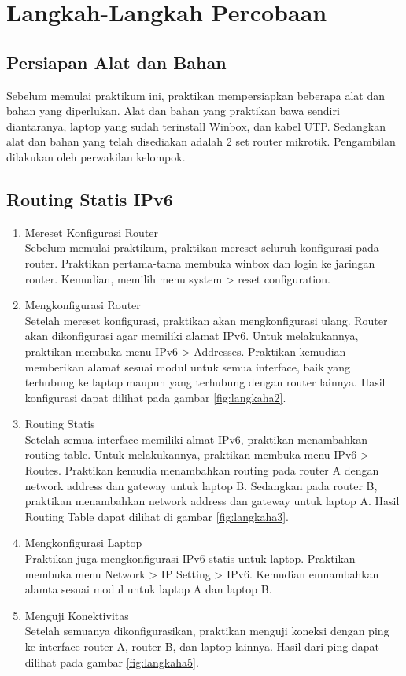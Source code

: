\section{Langkah-Langkah Percobaan}
\subsection{Persiapan Alat dan Bahan}
Sebelum memulai praktikum ini, praktikan mempersiapkan beberapa alat dan bahan yang diperlukan. Alat dan bahan yang praktikan bawa sendiri diantaranya, laptop yang sudah terinstall Winbox, dan kabel UTP. Sedangkan alat dan bahan yang telah disediakan adalah 2 set router mikrotik. Pengambilan dilakukan oleh perwakilan kelompok.

\subsection{Routing Statis IPv6}
\begin{enumerate}
  \item Mereset Konfigurasi Router \\
  Sebelum memulai praktikum, praktikan mereset seluruh konfigurasi pada router. Praktikan pertama-tama membuka winbox dan login ke jaringan router. Kemudian, memilih menu system > reset configuration.
  \item Mengkonfigurasi Router \\
  Setelah mereset konfigurasi, praktikan akan mengkonfigurasi ulang. Router akan dikonfigurasi agar memiliki alamat IPv6. Untuk melakukannya, praktikan membuka menu IPv6 > Addresses. Praktikan kemudian memberikan alamat sesuai modul untuk semua interface, baik yang terhubung ke laptop maupun yang terhubung dengan router lainnya. Hasil konfigurasi dapat dilihat pada gambar \ref{fig:langkaha2}.
  \item Routing Statis \\
  Setelah semua interface memiliki almat IPv6, praktikan menambahkan routing table. Untuk melakukannya, praktikan membuka menu IPv6 > Routes. Praktikan kemudia menambahkan routing pada router A dengan network address dan gateway untuk laptop B. Sedangkan pada router B, praktikan menambahkan network address dan gateway untuk laptop A. Hasil Routing Table dapat dilihat di gambar \ref{fig:langkaha3}.
  \item Mengkonfigurasi Laptop\\
  Praktikan juga mengkonfigurasi IPv6 statis untuk laptop. Praktikan membuka menu Network > IP Setting > IPv6. Kemudian emnambahkan alamta sesuai modul untuk laptop A dan laptop B.
  \item Menguji Konektivitas \\
  Setelah semuanya dikonfigurasikan, praktikan menguji koneksi dengan ping ke interface router A, router B, dan laptop lainnya. Hasil dari ping dapat dilihat pada gambar \ref{fig:langkaha5}.
\end{enumerate}

